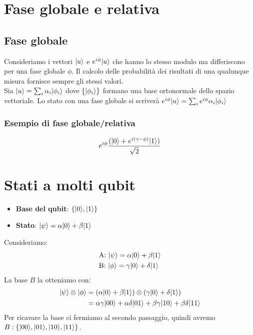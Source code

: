 \documentclass[12pt, a4paper]{report}
\begin{document}
\section{Fase globale e relativa}
\subsection{Fase globale}
Consideriamo i vettori $| u \rangle$ e $e^{i\phi}| u \rangle$ che hanno lo stesso modulo ma differiscono per una fase globale $\phi$. Il calcolo delle probabilità dei risultati di una qualunque misura fornisce sempre gli stessi valori.\\
Sia $| u \rangle=\sum_{i}\alpha_{i}| \phi_{i} \rangle$ dove $\{| \phi_{i} \rangle\}$ formano una base ortonormale dello spazio vettoriale. Lo stato con una fase globale si scriverà $e^{i\phi}| u \rangle=\sum_{i}e^{i\phi}\alpha_{i}| \phi_{i} \rangle$
\subsubsection{Esempio di fase globale/relativa}
\begin{equation*}
    \tikzmark{ephi}e^{i\phi}\frac{(\ket{0}+\tikzmark{ephigamma}e^{i(\gamma - \phi)}\ket{1})}{\sqrt{2}}
\end{equation*}
\section{Stati a molti qubit}
\begin{itemize}
    \item \textbf{Base del qubit}: $\{| 0 \rangle,| 1 \rangle\}$
    \item \textbf{Stato}: $| \psi \rangle=\alpha| 0 \rangle+\beta| 1 \rangle$
\end{itemize}
Consideriamo:
\begin{equation}
    \begin{split}
        &\text{A: } | \psi \rangle = \alpha| 0 \rangle+\beta| 1 \rangle \\
        &\text{B: } | \phi \rangle = \gamma| 0 \rangle+\delta| 1 \rangle
    \end{split}
\end{equation}
La base $B$ la otteniamo con:
\begin{equation*}
    \begin{split}
        | \psi \rangle\otimes| \phi \rangle &= \left(\alpha| 0 \rangle+\beta| 1 \rangle\right)\otimes\left(\gamma| 0 \rangle+\delta| 1 \rangle\right)\\
        &= \alpha\gamma| 00 \rangle+\alpha\delta| 01 \rangle+\beta\gamma| 10 \rangle+\beta\delta| 11 \rangle
    \end{split}
\end{equation*}
Per ricavare la base ci fermiamo al secondo passaggio, quindi avremo $B:\left\{| 00 \rangle,| 01 \rangle,| 10 \rangle,| 11 \rangle\right\}$.
\end{document}
